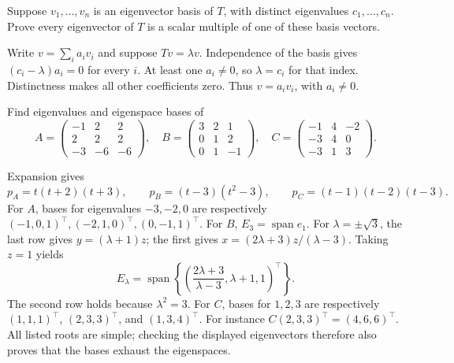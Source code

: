\begin{problem}\label{ex:08:all-vectors}
Suppose \(v_1,\ldots,v_n\) is an eigenvector basis of \(T\), with
distinct eigenvalues \(c_1,\ldots,c_n\). Prove every eigenvector of \(T\)
is a scalar multiple of one of these basis vectors.
\end{problem}
\begin{solution}
Write \(v=\sum_i a_iv_i\) and suppose \(Tv=\lambda v\).
Independence of the basis gives \((c_i-\lambda)a_i=0\) for every \(i\).
At least one \(a_i\ne0\), so \(\lambda=c_i\) for that index.
Distinctness makes all other coefficients zero. Thus
\(v=a_iv_i\), with \(a_i\ne0\).
\end{solution}

\begin{problem}\label{ex:08:lang-further}
Find eigenvalues and eigenspace bases of
\[
 A=\begin{pmatrix}-1&2&2\\2&2&2\\-3&-6&-6\end{pmatrix},\quad
 B=\begin{pmatrix}3&2&1\\0&1&2\\0&1&-1\end{pmatrix},\quad
 C=\begin{pmatrix}-1&4&-2\\-3&4&0\\-3&1&3\end{pmatrix}.
\]
\end{problem}
\begin{solution}
Expansion gives
\[
 p_A=t(t+2)(t+3),\qquad p_B=(t-3)(t^2-3),\qquad
 p_C=(t-1)(t-2)(t-3).
\]
For \(A\), bases for eigenvalues \(-3,-2,0\) are respectively
\((-1,0,1)^\top,(-2,1,0)^\top,(0,-1,1)^\top\).
For \(B\), \(E_3=\operatorname{span}e_1\).
For \(\lambda=\pm\sqrt3\), the last row gives \(y=(\lambda+1)z\);
the first gives \(x=(2\lambda+3)z/(\lambda-3)\).
Taking \(z=1\) yields
\[
 E_\lambda=\operatorname{span}
 \left\{\left(\frac{2\lambda+3}{\lambda-3},\lambda+1,1\right)^\top\right\}.
\]
The second row holds because \(\lambda^2=3\).
For \(C\), bases for \(1,2,3\) are respectively
\((1,1,1)^\top\), \((2,3,3)^\top\), and \((1,3,4)^\top\).
For instance \(C(2,3,3)^\top=(4,6,6)^\top\).
All listed roots are simple; checking the displayed eigenvectors
therefore also proves that the bases exhaust the eigenspaces.
\end{solution}
